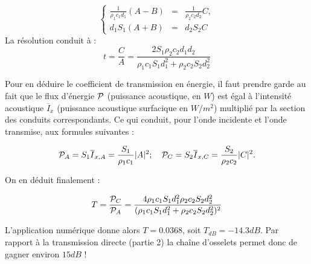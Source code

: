 \documentclass[10pt, a4paper]{article}
\begin{document}
\begin{enumerate}
{\begin{equation}
 \left\{ 
 \begin{array}{lcr}  \displaystyle \frac{1}{\rho_1 c_1 d_1} (A-B) &=&\displaystyle  \frac{1}{\rho_2 c_2 d_2} C,\\
 \displaystyle d_1 S_1 (A+B)&=& \displaystyle  d_2 S_2 C
 \end{array}
\right. 
\label{eq:ABCeqs}
\end{equation}
La résolution conduit à :
$$
t = \frac{C}{A} = \frac{2 S_1 \rho_2 c_2 d_1 d_2}{ \rho_1 c_1 S_1 d_1^2 + \rho_2 c_2 S_2 d_2^2 } 
$$

Pour en déduire le coefficient de transmission en énergie, il faut prendre garde au fait que le flux d'énergie $\cal P$ (puissance acoustique, en $W$)  est égal à l'intensité acoustique 
$\overline{I}_x$ (puissance acoustique surfacique en $W/m^2$) multiplié par la section des conduits correspondants. Ce qui conduit, pour l'onde incidente et l'onde transmise, aux formules suivantes :

$$
{\cal P}_{A} = S_1 \overline{I}_{x,A} = \frac{S_1}{\rho_1 c_1} |A|^2; \quad
{\cal P}_{C} = S_2 \overline{I}_{x,C} = \frac{S_2}{\rho_2 c_2} |C|^2.
$$

On en déduit finalement :

$$
T = \frac{{\cal P}_{C}}{{\cal P}_{A}} =
\frac{ 4\rho_1 c_1 S_1 d_1^2 \rho_2 c_2 S_2 d_2^2 }{(\rho_1 c_1 S_1 d_1^2 + \rho_2 c_2 S_2 d_2^2 )^2} 
$$

L'application numérique donne alors $T = 0.0368$, soit $T_{dB} = -14.3 dB$.
Par rapport à la transmission directe (partie 2) la chaîne d'osselets permet donc de gagner environ $15 dB$ !
}
  
\end{enumerate}



 




\end{document}
